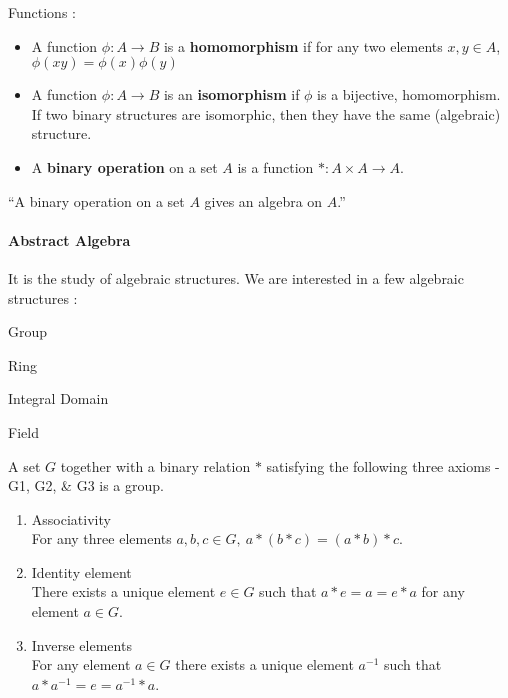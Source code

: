 \begin{definition} Functions :
	\begin{itemize}
		\item A function $\phi : A \to B$ is a \textbf{homomorphism} if for any two elements $x,y \in A$, $\phi (xy) = \phi(x)\phi(y)$%
		\item A function $\phi : A \to B$ is an \textbf{isomorphism} if $\phi$ is a bijective, homomorphism. If two binary structures  are isomorphic, then they have the same (algebraic) structure.%
		\item A \textbf{binary operation} on a set $A$ is a function $\ast : A \times A \to A$. %
	\end{itemize}
\end{definition}

``A binary operation on a set $A$ gives an algebra on $A$.'' %
\begin{story}
\paragraph{Abstract Algebra}
	It is the study of algebraic structures. We are interested in a few algebraic structures :
	\begin{enumerate*}
		\item Group
		\item Ring
		\item Integral Domain
		\item Field
	\end{enumerate*}
\end{story}

\begin{definition}[Group]
	A set $G$ together with a binary relation $\ast$ satisfying the following three axioms -G1, G2, \& G3 is a group.%
\begin{enumerate}[label=G\arabic*]
	\item Associativity \\ For any three elements $a,b,c \in G,\ a \ast (b \ast c) = (a \ast b) \ast c$.
	\item Identity element \\There exists a unique element $e \in G$ such that $a \ast e = a = e \ast a$ for any element $a \in G$.
	\item Inverse elements \\For any element $a \in G$ there exists a unique element $a^{-1}$ such that $a \ast a^{-1} = e = a^{-1} \ast a$.
\end{enumerate}
\end{definition}

